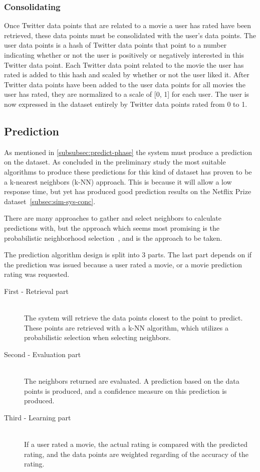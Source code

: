 \subsubsection{Consolidating}
	Once Twitter data points that are related to a movie a user has rated have been retrieved, these data points must be consolidated with the user's data points. The user data points is a hash of Twitter data points that point to a number indicating whether or not the user is positively or negatively interested in this Twitter data point. Each Twitter data point related to the movie the user has rated is added to this hash and scaled by whether or not the user liked it. After Twitter data points have been added to the user data points for all movies the user has rated, they are normalized to a scale of [0, 1] for each user. The user is now expressed in the dataset entirely by Twitter data points rated from 0 to 1.

\subsection{Prediction}\label{algorithm-design:prediction}
As mentioned in \ref{subsubsec:predict-phase} the system must produce a prediction on the dataset. As concluded in the preliminary study the most suitable algorithms to produce these predictions for this kind of dataset has proven to be a k-nearest neighbors (k-NN) approach. This is because it will allow a low response time, but yet has produced good prediction results on the Netflix Prize dataset~\ref{subsec:sim-sys-conc}.

There are many approaches to gather and select neighbors to calculate predictions with, but the approach which seems most promising is the probabilistic neighborhood selection~\cite{probcobfilter}, and is the approach to be taken.

The prediction algorithm design is split into 3 parts. The last part depends on if the prediction was issued because a user rated a movie, or a movie prediction rating was requested.

\begin{description}
    \item[First - Retrieval part] \hfill \\
    The system will retrieve the data points closest to the point to predict. These points are retrieved with a k-NN algorithm, which utilizes a probabilistic selection when selecting neighbors.

    \item[Second - Evaluation part] \hfill \\
    The neighbors returned are evaluated. A prediction based on the data points is produced, and a confidence measure on this prediction is produced.

    \item[Third - Learning part] \hfill \\
    If a user rated a movie, the actual rating is compared with the predicted rating, and the data points are weighted regarding of the accuracy of the rating.
\end{description}

